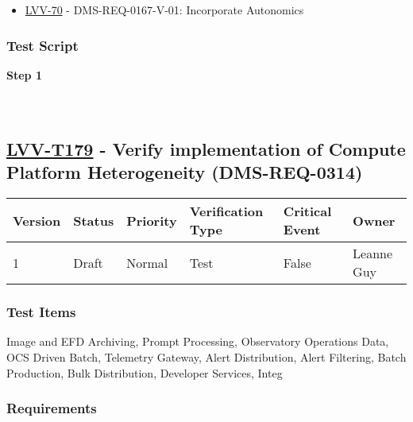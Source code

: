 \begin{itemize}
\tightlist
\item
  \href{https://jira.lsstcorp.org/browse/LVV-70}{LVV-70} -
  DMS-REQ-0167-V-01: Incorporate Autonomics
\end{itemize}

\hypertarget{test-script-155}{%
\subsubsection{Test Script}\label{test-script-155}}

\textbf{Step 1}\\
~\\
~\\

\hypertarget{lvv-t179---verify-implementation-of-compute-platform-heterogeneity-dms-req-0314}{%
\subsection{\texorpdfstring{\href{https://jira.lsstcorp.org/secure/Tests.jspa\#/testCase/LVV-T179}{LVV-T179}
- Verify implementation of Compute Platform Heterogeneity
(DMS-REQ-0314)}{LVV-T179 - Verify implementation of Compute Platform Heterogeneity (DMS-REQ-0314)}}\label{lvv-t179---verify-implementation-of-compute-platform-heterogeneity-dms-req-0314}}

\begin{longtable}[]{@{}llllll@{}}
\toprule
Version & Status & Priority & Verification Type & Critical Event &
Owner\tabularnewline
\midrule
\endhead
1 & Draft & Normal & Test & False & Leanne Guy\tabularnewline
\bottomrule
\end{longtable}

\hypertarget{test-items-155}{%
\subsubsection{Test Items}\label{test-items-155}}

Image and EFD Archiving, Prompt Processing, Observatory Operations Data,
OCS Driven Batch, Telemetry Gateway, Alert Distribution, Alert
Filtering, Batch Production, Bulk Distribution, Developer Services,
Integ

\hypertarget{requirements-156}{%
\subsubsection{Requirements}\label{requirements-156}}

